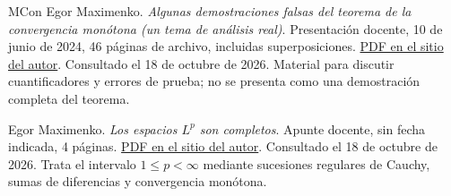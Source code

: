 \begin{thebibliography}{MCon}
Egor Maximenko. \emph{Algunas demostraciones falsas del teorema de la convergencia monótona (un tema de análisis real)}. Presentación docente, 10 de junio de 2024, 46 páginas de archivo, incluidas superposiciones. \href{https://esfm.egormaximenko.com/analysis/monotone_convergence_theorem_false_proofs_presentation_es.pdf}{PDF en el sitio del autor}. Consultado el 18 de octubre de 2026. Material para discutir cuantificadores y errores de prueba; no se presenta como una demostración completa del teorema.

Egor Maximenko. \emph{Los espacios $L^p$ son completos}. Apunte docente, sin fecha indicada, 4 páginas. \href{https://esfm.egormaximenko.com/analysis/Lp_is_complete_es.pdf}{PDF en el sitio del autor}. Consultado el 18 de octubre de 2026. Trata el intervalo $1\le p<\infty$ mediante sucesiones regulares de Cauchy, sumas de diferencias y convergencia monótona.
\end{thebibliography}
